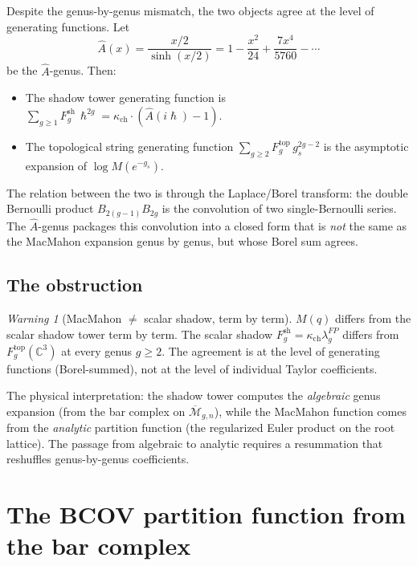 \documentclass[11pt]{amsart}
\theoremstyle{plain}
\theoremstyle{definition}
\theoremstyle{remark}
\newtheorem{warning}[theorem]{Warning}
\renewcommand{\hbar}{\hslash}
\begin{document}
Despite the genus-by-genus mismatch, the two objects agree at
the level of generating functions. Let
\[
 \widehat{A}(x) = \frac{x/2}{\sinh(x/2)}
 = 1 - \frac{x^2}{24} + \frac{7x^4}{5760} - \cdots
\]
be the $\hat{A}$-genus. Then:
\begin{itemize}
 \item The shadow tower generating function is
 $\sum_{g \geq 1} F_g^{\mathrm{sh}} \, \hbar^{2g}
 = \kappa_{\mathrm{ch}} \cdot (\widehat{A}(i\hbar) - 1)$.
 \item The topological string generating function
 $\sum_{g \geq 2} F_g^{\mathrm{top}} \, g_s^{2g-2}$
 is the asymptotic expansion of $\log M(e^{-g_s})$.
\end{itemize}
The relation between the two is through the Laplace/Borel
transform: the double Bernoulli product $B_{2(g-1)} B_{2g}$
is the convolution of two single-Bernoulli series. The
$\hat{A}$-genus packages this convolution into a closed form
that is \emph{not} the same as the MacMahon expansion genus
by genus, but whose Borel sum agrees.

\subsection{The obstruction}

\begin{warning}[MacMahon $\neq$ scalar shadow, term by term]
$M(q)$ differs from the scalar shadow tower term by term.
The scalar shadow $F_g^{\mathrm{sh}} = \kappa_{\mathrm{ch}} \lambda_g^{FP}$
differs from $F_g^{\mathrm{top}}(\mathbb{C}^3)$ at every
genus $g \geq 2$. The agreement is at the level of generating
functions (Borel-summed), not at the level of individual
Taylor coefficients.
\end{warning}

\noindent
The physical interpretation: the shadow tower computes the
\emph{algebraic} genus expansion (from the bar complex on
$\overline{\mathcal{M}}_{g,n}$), while the MacMahon function
comes from the \emph{analytic} partition function (the
regularized Euler product on the root lattice). The passage
from algebraic to analytic requires a resummation that
reshuffles genus-by-genus coefficients.

\section{The BCOV partition function from the bar complex}
\label{sec:bcov-partition-function}
\end{document}

